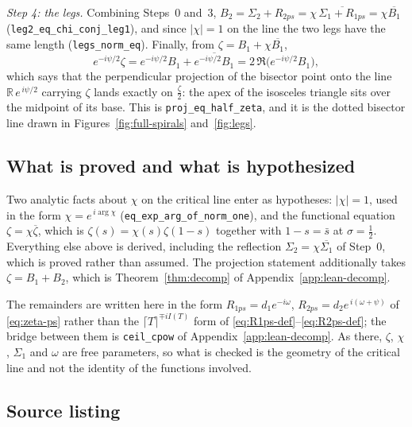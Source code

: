 \documentclass[11pt]{article}
\theoremstyle{definition}
\begin{document}
\emph{Step 4: the legs.} Combining Steps~0 and~3,
$B_2=\Sigma_2+R_{2ps}=\chi\,\overline{\Sigma_1+R_{1ps}}=\chi\overline{B_1}$
(\texttt{leg2\_eq\_chi\_conj\_leg1}), and since $|\chi|=1$ on the line the two
legs have the same length (\texttt{legs\_norm\_eq}). Finally, from
$\zeta=B_1+\chi\overline{B_1}$,
\begin{equation}\label{eq:lean-proj}
e^{-i\psi/2}\zeta
=e^{-i\psi/2}B_1+\overline{e^{-i\psi/2}B_1}
=2\,\Re\bigl(e^{-i\psi/2}B_1\bigr),
\end{equation}
which says that the perpendicular projection of the bisector point onto the line
$\mathbb{R}\,e^{\,i\psi/2}$ carrying $\zeta$ lands exactly on $\tfrac{\zeta}{2}$:
the apex of the isosceles triangle sits over the midpoint of its base. This is
\texttt{proj\_eq\_half\_zeta}, and it is the dotted bisector line drawn in
Figures~\ref{fig:full-spirals} and~\ref{fig:legs}.

\subsection{What is proved and what is hypothesized}

Two analytic facts about $\chi$ on the critical line enter as hypotheses:
$|\chi|=1$, used in the form $\chi=e^{\,i\arg\chi}$
(\texttt{eq\_exp\_arg\_of\_norm\_one}), and the functional equation
$\zeta=\chi\overline{\zeta}$, which is $\zeta(s)=\chi(s)\zeta(1-s)$ together with
$1-s=\bar s$ at $\sigma=\tfrac12$. Everything else above is derived, including
the reflection $\Sigma_2=\chi\overline{\Sigma_1}$ of Step~0, which is proved
rather than assumed. The projection statement additionally takes
$\zeta=B_1+B_2$, which is Theorem~\ref{thm:decomp} of
Appendix~\ref{app:lean-decomp}.

The remainders are written here in the form $R_{1ps}=d_1e^{-i\omega}$,
$R_{2ps}=d_2e^{\,i(\omega+\psi)}$ of \eqref{eq:zeta-ps} rather than the
$\lceil T\rceil^{\mp iI(T)}$ form of
\eqref{eq:R1ps-def}--\eqref{eq:R2ps-def}; the bridge between them is
\texttt{ceil\_cpow} of Appendix~\ref{app:lean-decomp}. As there, $\zeta$, $\chi$,
$\Sigma_1$ and $\omega$ are free parameters, so what is checked is the geometry
of the critical line and not the identity of the functions involved.

\subsection{Source listing}


\end{document}
